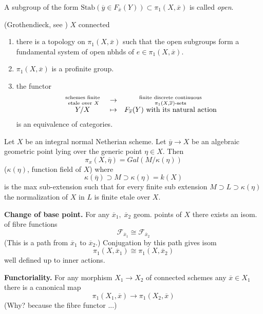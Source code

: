 \begin{definition}
\label{definition-open}
A subgroup of the form
$\text{Stab}(\overline y\in F_{\overline x}(Y))\subset \pi_1(X, \overline x)$
is called {\it open}.
\end{definition}

\begin{theorem}
\label{theorem-fundamental-group}
(Grothendieck, see \cite{SGA1}) $X$ connected
\begin{enumerate}
\item there is a topology on $\pi_1(X, \overline x)$ such that the open
subgroups form a fundamental system of open nbhds of $e\in \pi_1(X, \overline
x)$.
\item $\pi_1(X, \overline x)$ is a profinite group.
\item the functor
$$
\begin{matrix}
\text{ schemes finite }\atop \text{ etale over }X & \to &
\text{ finite discrete continuous }\atop \pi_1(X, \overline x)\text{-sets}\\
Y / X& \mapsto & F_{\overline x}(Y) \text{ with its natural action}
\end{matrix}
$$
is an equivalence of categories.
\end{enumerate}
\end{theorem}

\begin{proposition}
\label{proposition-integral-normal-fundamental-group}
Let $X$ be an integral normal Netherian scheme. Let
$\overline y\to X$ be an algebraic geometric point lying
over the generic point $\eta\in X$. Then
$$
\pi_x(X, \overline \eta) = Gal(M/\kappa(\eta))
$$
($\kappa(\eta)$, function field of $X$) where
$$
\kappa(\overline \eta)\supset M\supset \kappa(\eta) = k(X)
$$
is the max sub-extension such that for every finite sub extension
$M\supset L\supset \kappa(\eta)$ the normalization of $X$ in $L$ is finite
etale over $X$.
\end{proposition}

\noindent
{\bf Change of base point.} For any $\overline x_1, \; \overline x_2$
geom. points of $X$ there exists an isom. of fibre functions
$$
\mathcal{F}_{\overline x_1} \cong \mathcal{F}_{\overline x_2}
$$
(This is a path from $\overline x_1$ to $\overline x_2$.) Conjugation
by this path gives isom
$$
\pi_1(X, \overline x_1) \cong \pi_1(X, \overline x_2)
$$
well defined up to inner actions.

\medskip\noindent
{\bf Functoriality.} For any morphism $X_1\to X_2$ of connected schemes
any $\overline x\in X_1$ there is a canonical map
$$
\pi_1(X_1, \overline x) \to \pi_1(X_2, \overline x)
$$
(Why? because the fibre functor ...)

